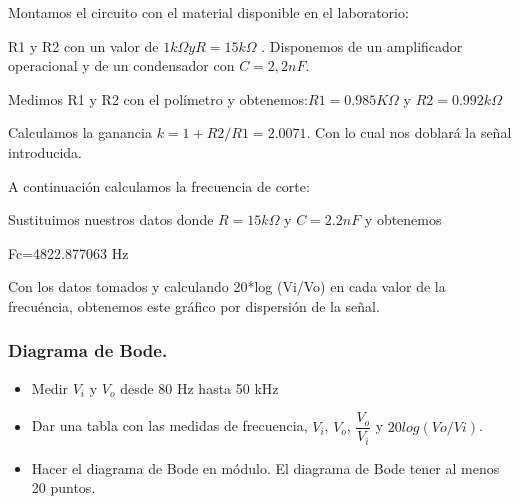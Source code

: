 \documentclass[paper=a4, fontsize=11pt]{scrartcl} %
\numberwithin{equation}{section} %
\numberwithin{figure}{section} %
\numberwithin{table}{section} %
\begin{document}
Montamos el circuito con el material disponible en el laboratorio:\newline

R1 y R2 con un valor de $ 1k\Omega y R=15k\Omega $ . Disponemos de un amplificador operacional y de un condensador con $ C=2,2nF $. \newline

Medimos R1 y R2 con el polímetro y obtenemos:$  R1=0.985K\Omega  $  y  $ R2=0.992k \Omega $ \newline

Calculamos la ganancia $ k=1+R2/R1=2.0071 $. Con lo cual nos doblará la señal introducida.
\newline

A continuación calculamos la frecuencia de corte:\newline

Sustituimos nuestros datos donde $ R=15k\Omega $ y $ C=2.2nF $ y obtenemos \newline

Fc=4822.877063 Hz\newline


Con los datos tomados y calculando 20*log (Vi/Vo) en cada valor de la frecuéncia, obtenemos este gráfico por dispersión de la señal.\newline

\newpage



\subsubsection{Diagrama de Bode.}

\begin{itemize}
	\item Medir $ V_{i} $ y $ V_{o} $ desde 80 Hz hasta 50 kHz 
	\item Dar una tabla con las medidas de frecuencia, $ V_{i} $, $ V_{o} $, $ \dfrac{V_{o}}{V_{i}} $ y $ 20log(Vo/Vi) $.
	\item Hacer el diagrama de Bode en módulo. El diagrama de Bode tener al menos 20 puntos.
\end{itemize}
\end{document}
